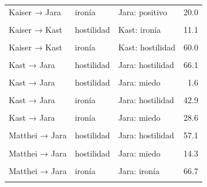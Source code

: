 \documentclass[
  letterpaper,
  numbers=noendperiod,
  fontsize=11pt,
  DIV=12,
  titlepage=false]{scrreprt}
\begin{document}
\begin{table}
{{\begin{tabular}{lllr}
\addlinespace
Kaiser → Jara & ironía & Jara: positivo & 20.0\\
\cellcolor{gray!10}{Kaiser → Kast} & \cellcolor{gray!10}{hostilidad} & \cellcolor{gray!10}{Kast: hostilidad} & \cellcolor{gray!10}{77.8}\\
Kaiser → Kast & hostilidad & Kast: ironía & 11.1\\
\cellcolor{gray!10}{Kaiser → Kast} & \cellcolor{gray!10}{hostilidad} & \cellcolor{gray!10}{Kast: positivo} & \cellcolor{gray!10}{11.1}\\
Kaiser → Kast & ironía & Kast: hostilidad & 60.0\\
\addlinespace
\cellcolor{gray!10}{Kaiser → Kast} & \cellcolor{gray!10}{ironía} & \cellcolor{gray!10}{Kast: ironía} & \cellcolor{gray!10}{40.0}\\
Kast → Jara & hostilidad & Jara: hostilidad & 66.1\\
\cellcolor{gray!10}{Kast → Jara} & \cellcolor{gray!10}{hostilidad} & \cellcolor{gray!10}{Jara: ironía} & \cellcolor{gray!10}{29.0}\\
Kast → Jara & hostilidad & Jara: miedo & 1.6\\
\cellcolor{gray!10}{Kast → Jara} & \cellcolor{gray!10}{hostilidad} & \cellcolor{gray!10}{Jara: positivo} & \cellcolor{gray!10}{3.2}\\
\addlinespace
Kast → Jara & ironía & Jara: hostilidad & 42.9\\
\cellcolor{gray!10}{Kast → Jara} & \cellcolor{gray!10}{ironía} & \cellcolor{gray!10}{Jara: ironía} & \cellcolor{gray!10}{28.6}\\
Kast → Jara & ironía & Jara: miedo & 28.6\\
\cellcolor{gray!10}{Kast → Jara} & \cellcolor{gray!10}{miedo} & \cellcolor{gray!10}{Jara: hostilidad} & \cellcolor{gray!10}{100.0}\\
Matthei → Jara & hostilidad & Jara: hostilidad & 57.1\\
\addlinespace
\cellcolor{gray!10}{Matthei → Jara} & \cellcolor{gray!10}{hostilidad} & \cellcolor{gray!10}{Jara: ironía} & \cellcolor{gray!10}{14.3}\\
Matthei → Jara & hostilidad & Jara: miedo & 14.3\\
\cellcolor{gray!10}{Matthei → Jara} & \cellcolor{gray!10}{hostilidad} & \cellcolor{gray!10}{Jara: positivo} & \cellcolor{gray!10}{14.3}\\
Matthei → Jara & ironía & Jara: ironía & 66.7\\
\cellcolor{gray!10}{Matthei → Jara} & \cellcolor{gray!10}{ironía} & \cellcolor{gray!10}{Jara: miedo} & \cellcolor{gray!10}{33.3}\\

\end{tabular}}}
\end{table}
\end{document}
